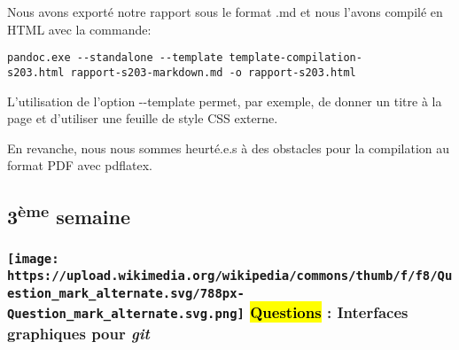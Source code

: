 \documentclass{report}
\begin{document}
Nous avons exporté notre rapport sous le format .md et nous l'avons
compilé en HTML avec la commande:

\texttt{pandoc.exe\ -\/-standalone\ -\/-template\ template-compilation-s203.html\ rapport-s203-markdown.md\ -o\ rapport-s203.html}

L'utilisation de l'option -\/-template permet, par exemple, de donner un
titre à la page et d'utiliser une feuille de style CSS externe.

En revanche, nous nous sommes heurté.e.s à des obstacles pour la
compilation au format PDF avec pdflatex.

\subsection{\texorpdfstring{3\textsuperscript{ème}
semaine}{3ème semaine}}\label{3S}

\subsubsection[ \hl{Questions} : Interfaces graphiques pour
\emph{git}]{\texorpdfstring{\protect\texttt{[image: https://upload.wikimedia.org/wikipedia/commons/thumb/f/f8/Question\_mark\_alternate.svg/788px-Question\_mark\_alternate.svg.png]}
\hl{Questions} : Interfaces graphiques pour
\emph{git}}{drawing Questions : Interfaces graphiques pour git}}\label{drawing-questions-interfaces-graphiques-pour-git}
\end{document}
